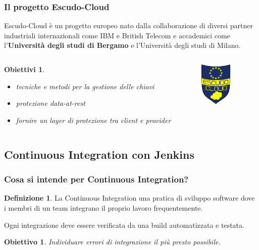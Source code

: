 \documentclass{beamer}
\theoremstyle{definition}
\newtheorem{definizione}{Definizione}
\theoremstyle{plain}
\newtheorem{obiettivo}{Obiettivo}
\newtheorem{obiettivi}{Obiettivi}
\begin{document}
\begin{frame}
\frametitle{Il progetto Escudo-Cloud}
\alert{Escudo-Cloud} è un progetto europeo nato dalla collaborazione di diversi partner industriali internazionali come IBM e British Telecom e accademici come l'\textbf{Università degli studi di Bergamo} e l'Università degli studi di Milano.\\
\vspace*{1cm}
\begin{columns}
\begin{obiettivi}
\begin{itemize}
\item
tecniche e metodi per la gestione delle chiavi
\item
protezione data-at-rest
\item
fornire un layer di protezione tra client e provider
\end{itemize}
\end{obiettivi}
\begin{figure}[!h]
	\begin{center}
\includegraphics[width=1.5cm]{ESCUDO-CLOUD.png}
\end{center}
\end{figure}
\end{columns}
\end{frame}
\subsection{Continuous Integration con Jenkins}
\begin{frame}
\frametitle{Cosa si intende per Continuous Integration?}
\begin{definizione}
La \alert{Continuous Integration} una pratica di sviluppo software dove i membri di un team \alert{integrano} il proprio lavoro \alert{frequentemente}.
\end{definizione}
\vspace*{0.5cm}
Ogni integrazione deve essere \alert{verificata} da una build automatizzata e \alert{testata}.
\begin{obiettivo}
Individuare errori di integrazione il più presto possibile.
\end{obiettivo}

\end{frame}
\end{document}
